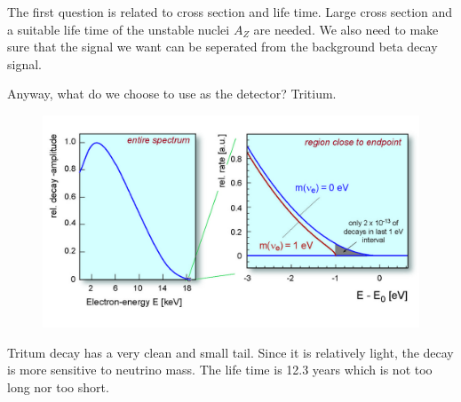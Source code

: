 \documentclass[letterpaper,12pt,english]{sphinxmanual}
\begin{document}
The first question is related to cross section and life time. Large cross section and a suitable life time of the unstable nuclei \(A_Z\) are needed. We also need to make sure that the signal we want can be seperated from the background beta decay signal.

Anyway, what do we choose to use as the detector? Tritium.
\begin{figure}[htbp]
\centering

\includegraphics{spectrum_rdax_1200x678.jpg}
\end{figure}

Tritum decay has a very clean and small tail. Since it is relatively light, the decay is more sensitive to neutrino mass. The life time is 12.3 years which is not too long nor too short.
\end{document}
